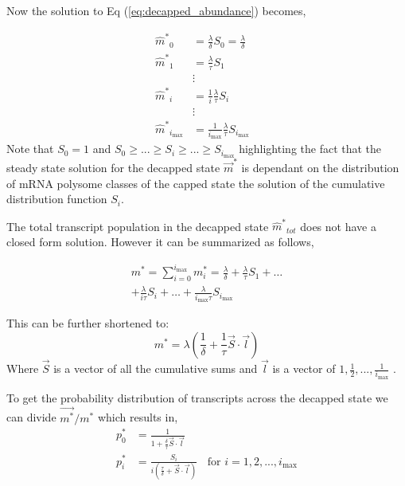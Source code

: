 \documentclass[10pt,letterpaper]{article}
\newcommand{\imax}{\ensuremath{{i_{\max}}}\xspace}
\newcommand{\mhat}{\ensuremath{\hat{m}}\xspace}
\newcommand{\mhatstar}{\ensuremath{\mhat^{*}}\xspace}
\newcommand{\mvec}{\ensuremath{\vec{m}}\xspace}
\newcommand{\mvecstar}{\ensuremath{\mvec^*}\xspace}
\newcommand{\msumstar}{\ensuremath{m^*}\xspace}
\begin{document}
Now the solution to Eq (\ref{eq:decapped_abundance}) becomes,

\begin{align}
\label{eq:decapped_solution} 
\mhatstar_0  &= \frac{\lambda}{\delta}S_{0}=\frac{\lambda}{\delta} \nonumber \\
\mhatstar_1  &= \frac{\lambda}{\tau}S_{1} \nonumber \\
& \vdots &  \\
\mhatstar_i  &= \frac{1}{i}\frac{\lambda}{\tau}S_{i}  \nonumber \\
& \vdots & \nonumber \\
\mhatstar_{\imax}  &= \frac{1}{\imax}\frac{\lambda}{\tau}S_{\imax}  \nonumber
\end{align}
 Note that $S_{0}=1$ and $ S_{0} \ge ... \ge S_{i} \ge ... \ge S_{\imax}$ highlighting the fact that the steady state solution for the decapped state \mvecstar is dependant on the distribution of mRNA polysome classes of the capped state the solution of the cumulative distribution function $S_i$. %

The total transcript population in the decapped state $\mhatstar_{tot}$ does not have a closed form solution. However it can be summarized as follows,


\begin{align*}
	\msumstar = \sum_{i=0}^{\imax} m_{i}^{*} = \frac{\lambda}{\delta} + \frac{\lambda}{\tau}S_{1}+ \hdots \\
 + \frac{\lambda}{i \tau}S_{i} + \hdots  + \frac{\lambda}{\imax \tau}S_{\imax} 
\end{align*}

This can be further shortened to:
\begin{equation} \label{eq: marked_total_pop}
	\msumstar = \lambda(\frac{1}{\delta} + \frac{1}{\tau}\vec{S} \cdot \vec{l}	) 
\end{equation}
Where $\vec{S}$ is a vector of all the cumulative sums and $\vec{l}$ is a vector of $1,\frac{1}{2},...,\frac{1}{\imax}$ . 


To get the probability distribution of transcripts across the decapped state we can divide $\vec{m^{*}}/\msumstar$ which results in,
\begin{align}\label{eq:decapped_distribution}
	p_{0}^{*} &= \frac{1}{1 + \frac{\delta}{\tau}\vec{S} \cdot \vec{l}}	\\
  	p_{i}^{*} &= \frac{S_{i}}{i(\frac{\tau}{\delta} + \vec{S} \cdot \vec{l})}	\:\:\:\: \text{for } i=1, 2, ..., \imax
\end{align}
\end{document}
